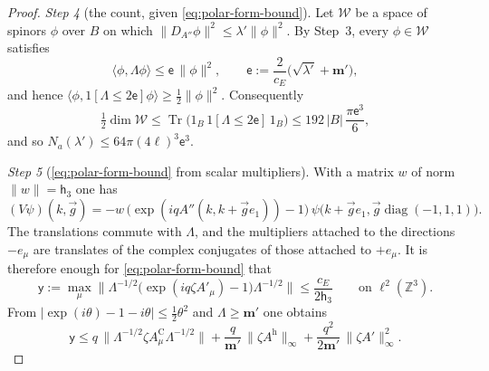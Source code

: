 \documentclass[11pt,letterpaper,reqno]{amsart}
\theoremstyle{definition}
\begin{document}
\begin{proof}
\emph{Step 4} (the count, given \eqref{eq:polar-form-bound}).
Let $\mathcal W$ be a space of spinors $\phi$ over $B$ on which $\|D_{A''}\phi\|^2\le\lambda'\|\phi\|^2$.
By Step~3, every $\phi\in\mathcal W$ satisfies
\begin{equation*}
\langle\phi,\Lambda\phi\rangle\le\mathsf e\,\|\phi\|^2,\qquad\mathsf e:=\frac{2}{c_E}\bigl(\sqrt{\lambda'}+\mathbf m'\bigr),
\end{equation*}
and hence $\langle\phi,\allowbreak 1[\Lambda\le2\mathsf e]\phi\rangle\ge\frac12\|\phi\|^2$.
Consequently
\begin{equation*}
\tfrac12\dim\mathcal W\le\operatorname{Tr}\bigl(1_B\,1[\Lambda\le2\mathsf e]\,1_B\bigr)\le192\,|B|\,\frac{\pi\mathsf e^3}{6},
\end{equation*}
and so $N_a(\lambda')\le64\pi(4\ell)^3\mathsf e^3$.

\emph{Step 5} (\eqref{eq:polar-form-bound} from scalar multipliers).
With a matrix $w$ of norm $\|w\|=\mathsf h_3$ \cite[Definition~2.10]{QEDII} one has
\begin{equation*}
(V\psi)(k,\vec g)=-w\,\bigl(\exp(iqA''(k,k+\vec ge_1))-1\bigr)\,\psi\bigl(k+\vec ge_1,\vec g\operatorname{diag}(-1,1,1)\bigr).
\end{equation*}
The translations commute with $\Lambda$, and the multipliers attached to the directions $-e_\mu$ are translates of the complex conjugates of those attached to $+e_\mu$.
It is therefore enough for \eqref{eq:polar-form-bound} that
\begin{equation*}
\mathsf y:=\max_\mu\bigl\|\Lambda^{-1/2}\bigl(\exp(iq\zeta A'_\mu)-1\bigr)\Lambda^{-1/2}\bigr\|\le\frac{c_E}{2\mathsf h_3}\qquad\text{on }\ell^2(\mathbb Z^3).
\end{equation*}
From $|\exp(i\theta)-1-i\theta|\le\frac12\theta^2$ and $\Lambda\ge\mathbf m'$ one obtains
\begin{equation*}
\mathsf y\le q\,\|\Lambda^{-1/2}\zeta A^{\mathrm C}_\mu\Lambda^{-1/2}\|+\frac{q}{\mathbf m'}\,\|\zeta A^{\mathrm h}\|_\infty+\frac{q^2}{2\mathbf m'}\,\|\zeta A'\|^2_\infty.
\end{equation*}


\end{proof}
\end{document}
